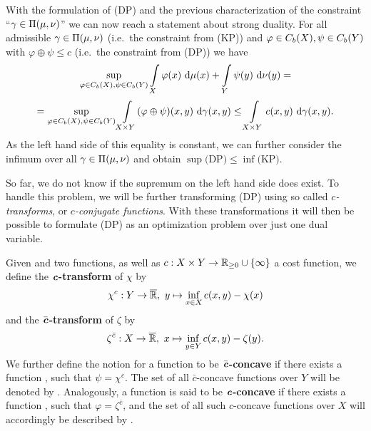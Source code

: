 With the formulation of (DP) and the previous characterization of the constraint ``$\gamma \in \TP{\mu}{\nu}$'' we can now reach a statement about strong duality. For all admissible $\gamma \in \TP{\mu}{\nu}$ (i.e.~the constraint from (KP)) and $\varphi \in \CF[b]{X}, \psi \in \CF[b]{Y}$ with $\varphi \oplus \psi \le c$ (i.e.~the constraint from (DP)) we have
\[ \sup\limits_{\varphi \in \CF[b]{X}, \psi \in \CF[b]{Y}} \int\limits_{X} \varphi(x)~\Dx{\mu} + \int\limits_{Y} \psi(y)~\Dx[y]{\nu} = \]
\[ = \sup\limits_{\varphi \in \CF[b]{X}, \psi \in \CF[b]{Y}} \int\limits_{X \times Y} (\varphi \oplus \psi)(x, y)~\Dx[x, y]{\gamma} \le \int\limits_{X \times Y} c(x, y)~\Dx[x, y]{\gamma}. \]
As the left hand side of this equality is constant, we can further consider the infimum over all $\gamma \in \TP{\mu}{\nu}$ and obtain $\sup \text{(DP)} \le \inf \text{(KP)}$.

So far, we do not know if the supremum on the left hand side does exist. To handle this problem, we will be further transforming (DP) using so called \textit{$c$-transforms}, or \textit{$c$-conjugate functions}. With these transformations it will then be possible to formulate (DP) as an optimization problem over just one dual variable.

\begin{definition}\label{cTrafo}
	Given  and  two functions, as well as $\map[c]{X \times Y}{\RZero{} \cup{} \{ \infty \}}$ a cost function, we define the \textbf{$\text{\textbf{\textit{c}}}$-transform} of $\chi$ by
	\[ \map[\chi^c]{Y}{\Rbar},~y \mapsto \inf\limits_{x \in X} c(x, y) - \chi(x) \]
	and the \textbf{$\bar{\text{\textbf{\textit{c}}}}$-transform} of $\zeta$ by
	\[ \map[\zeta^{\bar{c}}]{X}{\Rbar},~x \mapsto \inf\limits_{y \in Y} c(x, y) - \zeta(y). \]
	We further define the notion for a function  to be \textbf{$\bar{\text{\textbf{\textit{c}}}}$-concave} if there exists a function , such that $\psi = \chi^c$. The set of all $\bar{c}$-concave functions over $Y$ will be denoted by . Analogously, a function  is said to be \textbf{$\text{\textbf{\textit{c}}}$-concave} if there exists a function , such that $\varphi = \zeta^{\bar{c}}$, and the set of all such $c$-concave functions over $X$ will accordingly be described by .
\end{definition}

